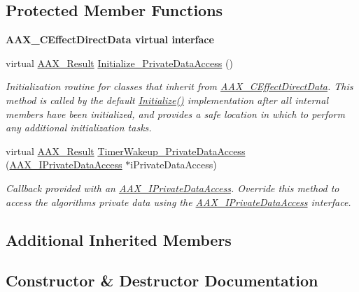 \subsection*{Protected Member Functions}
\begin{Indent}{\bf A\+A\+X\+\_\+\+C\+Effect\+Direct\+Data virtual interface}\par
\begin{DoxyCompactItemize}
\item 
virtual \hyperlink{a00149_a4d8f69a697df7f70c3a8e9b8ee130d2f}{A\+A\+X\+\_\+\+Result} \hyperlink{a00016_ac33b9e51d38ffc375df379018abd5899}{Initialize\+\_\+\+Private\+Data\+Access} ()
\begin{DoxyCompactList}\small\item\em Initialization routine for classes that inherit from \hyperlink{a00016}{A\+A\+X\+\_\+\+C\+Effect\+Direct\+Data}. This method is called by the default \hyperlink{a00016_ad89ee93781539d8df3b0710a186c7e0d}{Initialize()} implementation after all internal members have been initialized, and provides a safe location in which to perform any additional initialization tasks. \end{DoxyCompactList}\item 
virtual \hyperlink{a00149_a4d8f69a697df7f70c3a8e9b8ee130d2f}{A\+A\+X\+\_\+\+Result} \hyperlink{a00016_addd263d3a410d5c26148cee306cc7297}{Timer\+Wakeup\+\_\+\+Private\+Data\+Access} (\hyperlink{a00111}{A\+A\+X\+\_\+\+I\+Private\+Data\+Access} $\ast$i\+Private\+Data\+Access)
\begin{DoxyCompactList}\small\item\em Callback provided with an \hyperlink{a00111}{A\+A\+X\+\_\+\+I\+Private\+Data\+Access}. Override this method to access the algorithm\textquotesingle{}s private data using the \hyperlink{a00111}{A\+A\+X\+\_\+\+I\+Private\+Data\+Access} interface. \end{DoxyCompactList}\end{DoxyCompactItemize}
\end{Indent}
\subsection*{Additional Inherited Members}


\subsection{Constructor \& Destructor Documentation}
\hypertarget{a00016_a4a3e96ae0ad1f0be1813b27657f66fd9}{}
